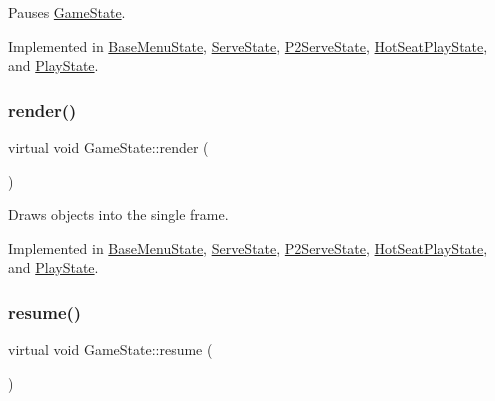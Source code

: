 Pauses \mbox{\hyperlink{class_game_state}{Game\+State}}. 



Implemented in \mbox{\hyperlink{class_base_menu_state_a3ac8e688220c609b467ca4ae4c6600d6}{Base\+Menu\+State}}, \mbox{\hyperlink{class_serve_state_ab3a85411b4cc260cfede50e3aa10573c}{Serve\+State}}, \mbox{\hyperlink{class_p2_serve_state_aa72fcf3306cf089d1efc7122a8147139}{P2\+Serve\+State}}, \mbox{\hyperlink{class_hot_seat_play_state_af0e96c626d63f71e714bbf8119308751}{Hot\+Seat\+Play\+State}}, and \mbox{\hyperlink{class_play_state_a5c135eed71fd8dbf30b75e577c28ad0d}{Play\+State}}.

\mbox{\label{class_game_state_a0d56cd5355f59a87cf95e1c6d719f329}} 
\subsubsection{\texorpdfstring{render()}{render()}}
{\footnotesize\ttfamily virtual void Game\+State\+::render (\begin{DoxyParamCaption}\item[{\mbox{\hyperlink{class_game_engine}{Game\+Engine}} $\ast$}]{ }\end{DoxyParamCaption})\hspace{0.3cm}{\ttfamily [pure virtual]}}



Draws objects into the single frame. 



Implemented in \mbox{\hyperlink{class_base_menu_state_a404076aa3e789fa75ba1bfe7752c1e18}{Base\+Menu\+State}}, \mbox{\hyperlink{class_serve_state_a91cd889069e5b9f073ac33addeed2913}{Serve\+State}}, \mbox{\hyperlink{class_p2_serve_state_acc6d131c7a5712a643b7f97c3bcdbd46}{P2\+Serve\+State}}, \mbox{\hyperlink{class_hot_seat_play_state_a66bbc19d0a2046a3ff2d926669d0ae26}{Hot\+Seat\+Play\+State}}, and \mbox{\hyperlink{class_play_state_a186b8cb25c420e2ce54002bcb08d8bee}{Play\+State}}.

\mbox{\label{class_game_state_a4a421c44f4dae6e9a4fbe10b6e8c47ac}} 
\subsubsection{\texorpdfstring{resume()}{resume()}}
{\footnotesize\ttfamily virtual void Game\+State\+::resume (\begin{DoxyParamCaption}{ }\end{DoxyParamCaption})\hspace{0.3cm}{\ttfamily [pure virtual]}}



